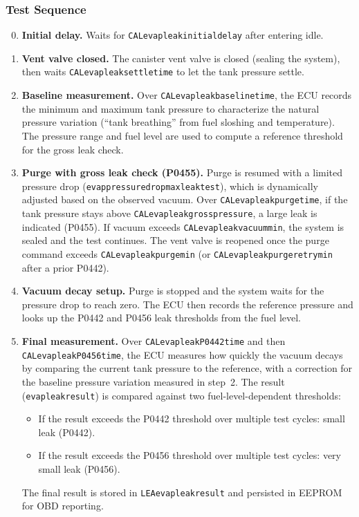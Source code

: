 \documentclass[a4paper,11pt]{article}
\renewcommand{\_}{\oldunderscore\allowbreak}
\begin{document}
\subsubsection*{Test Sequence}

\begin{enumerate}
\setcounter{enumi}{-1}
\item \textbf{Initial delay.} Waits for
      \texttt{CAL\_evap\_leak\_initial\_delay} after entering idle.
\item \textbf{Vent valve closed.} The canister vent valve is closed
      (sealing the system), then waits \texttt{CAL\_evap\_leak\_settle\_time}
      to let the tank pressure settle.
\item \textbf{Baseline measurement.} Over
      \texttt{CAL\_evap\_leak\_baseline\_time}, the ECU records the minimum
      and maximum tank pressure to characterize the natural pressure
      variation (``tank breathing'' from fuel sloshing and temperature). The
      pressure range and fuel level are used to compute a reference threshold
      for the gross leak check.
\item \textbf{Purge with gross leak check (P0455).} Purge is resumed with a
      limited pressure drop
      (\texttt{evap\_pressure\_drop\_max\_leak\_test}), which is dynamically
      adjusted based on the observed vacuum. Over
      \texttt{CAL\_evap\_leak\_purge\_time}, if the tank pressure stays above
      \texttt{CAL\_evap\_leak\_gross\_pressure}, a large leak is indicated
      (P0455). If vacuum exceeds \texttt{CAL\_evap\_leak\_vacuum\_min}, the
      system is sealed and the test continues. The vent valve is reopened
      once the purge command exceeds
      \texttt{CAL\_evap\_leak\_purge\_min} (or
      \texttt{CAL\_evap\_leak\_purge\_retry\_min} after a prior P0442).
\item \textbf{Vacuum decay setup.} Purge is stopped and the system waits for
      the pressure drop to reach zero. The ECU then records the reference
      pressure and looks up the P0442 and P0456 leak thresholds from the fuel
      level.
\item \textbf{Final measurement.} Over
      \texttt{CAL\_evap\_leak\_P0442\_time} and then
      \texttt{CAL\_evap\_leak\_P0456\_time}, the ECU measures how quickly the
      vacuum decays by comparing the current tank pressure to the reference,
      with a correction for the baseline pressure variation measured in
      step~2. The result (\texttt{evap\_leak\_result}) is compared against
      two fuel-level-dependent thresholds:
      \begin{itemize}
      \item If the result exceeds the P0442 threshold over multiple test
            cycles: small leak (P0442).
      \item If the result exceeds the P0456 threshold over multiple test
            cycles: very small leak (P0456).
      \end{itemize}
      The final result is stored in \texttt{LEA\_evap\_leak\_result} and
      persisted in EEPROM for OBD reporting.
\end{enumerate}
\end{document}
